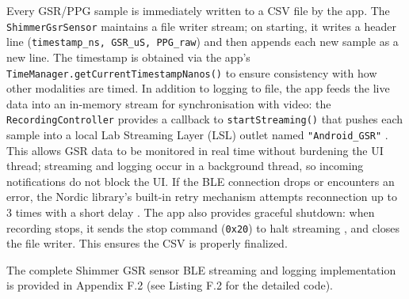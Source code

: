 Every GSR/PPG sample is immediately written to a CSV file by the app. The \texttt{ShimmerGsrSensor} maintains a file writer stream; on starting, it writes a header line (\texttt{timestamp\_ns, GSR\_uS, PPG\_raw}) and then appends each new sample as a new line. The timestamp is obtained via the app's \texttt{TimeManager.getCurrentTimestampNanos()} to ensure consistency with how other modalities are timed. In addition to logging to file, the app feeds the live data into an in-memory stream for synchronisation with video: the \texttt{RecordingController} provides a callback to \texttt{startStreaming()} that pushes each sample into a local Lab Streaming Layer (LSL) outlet named \texttt{"Android\_GSR"} \cite{ref9}. This allows GSR data to be monitored in real time without burdening the UI thread; streaming and logging occur in a background thread, so incoming notifications do not block the UI. If the BLE connection drops or encounters an error, the Nordic library's built-in retry mechanism attempts reconnection up to 3 times with a short delay \cite{ref14}. The app also provides graceful shutdown: when recording stops, it sends the stop command (\texttt{0x20}) to halt streaming \cite{ref15}, and closes the file writer. This ensures the CSV is properly finalized.

The complete Shimmer GSR sensor BLE streaming and logging implementation is provided in Appendix F.2 (see Listing F.2 for the detailed code).

